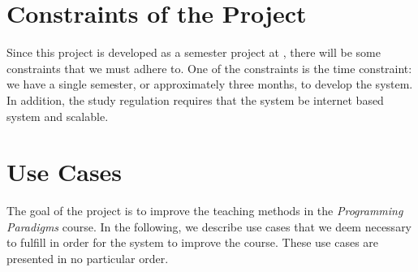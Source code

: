 \section{Constraints of the Project}
Since this project is developed as a semester project at \aau{}, there will be some constraints that we must adhere to.
One of the constraints is the time constraint: we have a single semester, or approximately three months, to develop the system.
In addition, the study regulation requires that the system be internet based system and scalable.

\section{Use Cases} \label{sec:use_cases}
The goal of the project is to improve the teaching methods in the \textit{Programming Paradigms} course.
In the following, we describe use cases that we deem necessary to fulfill in order for the system to improve the course.
These use cases are presented in no particular order.

